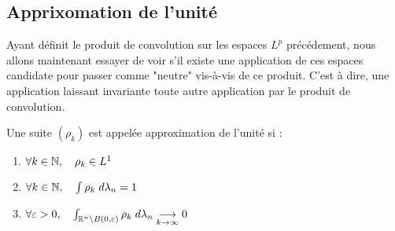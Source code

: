 \subsection{Apprixomation de l'unité}

Ayant définit le produit de convolution sur les espaces ${L}^p$ précédement, 
nous allons maintenant essayer de voir s'il existe une application de ces espaces candidate pour 
passer comme "neutre" vis-à-vis de ce produit. C'est à dire, une application laissant invariante 
toute autre application par le produit de convolution. 

\begin{comment}
    \begin{multicols}{2}
        \begin{tikzpicture}[scale=0.5]
            \draw[->,dashed] (-5, 0) -- (5, 0) node[anchor=west] {$x$};
            \draw[->,dashed] (0, -1) -- (0, 3) node[anchor=south] {$y$};
            \draw[thick] (-5,0) -- (0,0);
            \draw[thick] (0,1) -- (5,1) node[anchor=west] {$f = 1_{\R_+}$};
        \end{tikzpicture}
        
        \begin{tikzpicture}[scale=0.5]
            \draw[->,dashed] (-5, 0) -- (5, 0) ;
            \draw[->,dashed] (0, -1) -- (0, 3) node[anchor=south] {$y$};
            \draw[thick] (-5,0) -- (0,0);
            \draw[thick] (1,0) -- (5,0) node[anchor=west] {$\rho$};
            \draw[thick] (0,1) -- (1,1);
            \fill[pattern=north east lines] (0,0) -- (0,1) -- (1,1) -- (1,0) -- cycle; 
        \end{tikzpicture}
    \end{multicols}

    \begin{tikzpicture}[scale=0.5]
        \draw[->,dashed] (-5, 0) -- (5, 0) node[anchor=west] {$x$};
        \draw[->,dashed] (0, -1) -- (0, 3) node[anchor=south] {$y$};
        \draw[thick] (-5,0) -- (0,0);
        \draw[thick] (0,0) -- (1,1);
        \draw[thick] (1,1) -- (5,1) node[anchor=west] {$\rho \ast f$};
    \end{tikzpicture}
\end{comment}

\begin{definition}
    Une suite $(\rho_k)$ est appelée approximation de l'unité si :
    \begin{enumerate}
        \item $ \forall k \in \mathbb{N}, \quad \rho_k \in {L}^1$ 
        \item $ \forall k \in \mathbb{N}, \quad \int \rho_k \; d \lambda_n = 1 $
        \item $ \forall \varepsilon > 0, \quad \int_{\mathbb{R}^n \backslash B(0,\varepsilon)} \rho_k \; d \lambda_n \underset{k \to \infty}{\longrightarrow} 0 $
    \end{enumerate}
\end{definition}

